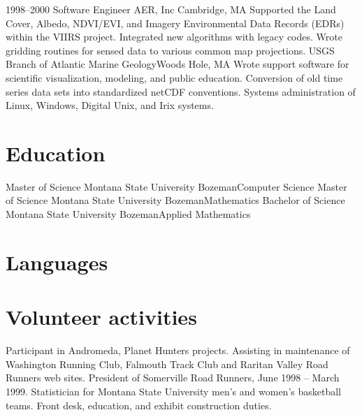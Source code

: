 \documentclass[11pt]{moderncv}  %
\begin{document}
\cventry
{1998--2000}
{Software Engineer}
{AER, Inc}
{Cambridge, MA}
{}
{
    Supported the Land Cover, Albedo, NDVI/EVI, and Imagery
    Environmental Data Records (EDRs) within the VIIRS project.
    Integrated new algorithms with legacy codes. Wrote gridding
    routines for sensed data to various common map projections.
}
    {USGS Branch of Atlantic Marine Geology}{Woods Hole, MA}{}{
    Wrote support software for scientific visualization, modeling,
    and public education. Conversion of old time series data sets
    into standardized netCDF conventions.  Systems administration
    of Linux, Windows, Digital Unix, and Irix systems.}

\section{Education}
    {Master of Science}
    {Montana State University}
    {Bozeman}{}{Computer Science}
    {Master of Science}
    {Montana State University}
    {Bozeman}{}{Mathematics}
    {Bachelor of Science}
    {Montana State University}
    {Bozeman}{}{Applied Mathematics}

\section{Languages}

\section{Volunteer activities}
  {Participant in Andromeda, Planet Hunters projects.}
  {Assisting in maintenance of Washington Running Club, Falmouth
  Track Club and Raritan Valley Road Runners web sites.
   President of Somerville Road Runners, June 1998 -- March 1999.}
  {Statistician for Montana State University men's and women's basketball
  teams.}
  {Front desk, education, and exhibit construction duties.}
\end{document}
